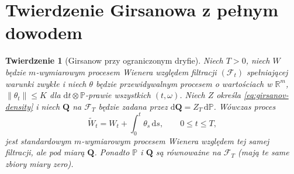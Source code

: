 \documentclass[11pt,a4paper,oneside]{report}
\numberwithin{equation}{chapter}
\theoremstyle{plain}
\newtheorem{twierdzenie}{Twierdzenie}[chapter]
\theoremstyle{definition}
\theoremstyle{remark}
\newcommand{\R}{\mathbb{R}}
\newcommand{\Prob}{\mathbb{P}}
\newcommand{\calF}{\mathcal{F}}
\newcommand{\dd}{\mathrm{d}}
\newcommand{\norm}[1]{\lVert #1\rVert}
\begin{document}
\section{Twierdzenie Girsanowa z pełnym dowodem}\label{sec:volIII:08:03}

\begin{twierdzenie}[Girsanow przy ograniczonym dryfie]\label{thm:volIII:08:01}
\label{th:girsanov-bounded}
Niech $T>0$, niech $W$ będzie $m$-wymiarowym
procesem Wienera względem filtracji $(\calF_t)$
spełniającej warunki zwykłe i niech $\theta$ będzie
przewidywalnym procesem o wartościach w $\R^m$,
$\norm{\theta_t}\le K$ dla $\dd t\otimes\Prob$-prawie
wszystkich $(t,\omega)$. Niech $Z$ określa
\eqref{eq:girsanov-density} i niech $\mathbf Q$ na
$\calF_T$ będzie zadana przez $\dd\mathbf Q=Z_T\,\dd\Prob$.
Wówczas proces
\[
\widetilde W_t=W_t+\int_0^t\theta_s\,\dd s,
\qquad 0\le t\le T,
\tag{8.5}\label{eq:shifted-wiener}
\]
jest standardowym $m$-wymiarowym procesem Wienera
względem tej samej filtracji, ale pod miarą $\mathbf Q$.
Ponadto $\Prob$ i $\mathbf Q$ są równoważne na
$\calF_T$ (mają te same zbiory miary zero).
\end{twierdzenie}
\end{document}
